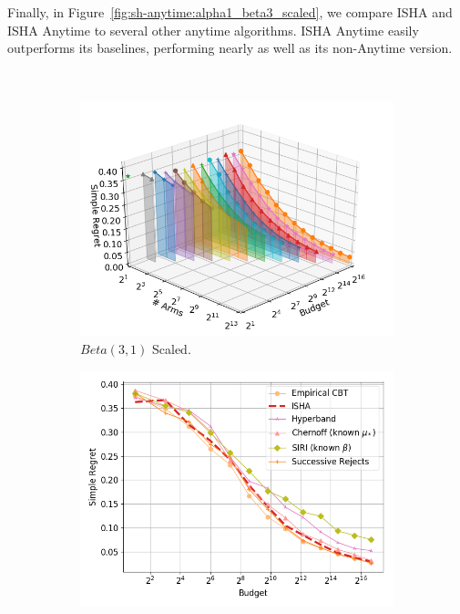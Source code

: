 Finally, in Figure~\ref{fig:sh-anytime:alpha1_beta3_scaled}, we compare ISHA 
and ISHA Anytime to several other anytime algorithms.
ISHA Anytime easily outperforms its baselines,
performing nearly as well as its non-Anytime version. 

​​​​​\begin{figure}
\centering
\begin{subfigure}{0.325\textwidth}%
	\includegraphics[width=\textwidth]{fixedbudget/figures/folder1/alpha1_beta3_scaled.png}
	\centering
	\caption{$Beta(3,1)$ Scaled.}
	\label{fig:sh-num-arms:alpha1_beta3_scaled}
\end{subfigure}
\begin{subfigure}{0.325\textwidth}%
	\includegraphics[width=\textwidth]{fixedbudget/figures/folder4/alpha1_beta3_scaled.png}

\end{subfigure}
\end{figure}
